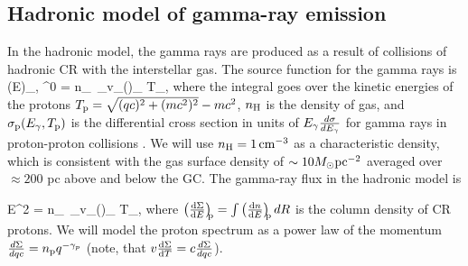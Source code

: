 

\subsection{Hadronic model of gamma-ray emission}
\label{sec:Pion_model}

In the hadronic model, the gamma rays are produced as a result of collisions of hadronic CR with the interstellar gas.
The source function for the gamma rays is 
\be
\left(E\right)_{\!\!\gamma, \pi^0}\! = \int n_\Hy\ \sigma_\pr v_\pr \left(\right)_{\!\!\pr} \de T_\pr,
\label{eq:had_spectrum}
\ee
where the integral goes over the kinetic energies of the protons $T_{\text{p}} = \sqrt{(qc)^2 + (mc^2)^2} - mc^2$,
$n_{\text{H}}$ is the density of gas, and $\sigma_{\text{p}} (E_\gamma, T_{\text{p}})$ is 
the differential cross section in units of $E_\gamma\frac{d\sigma}{d E_\gamma}$
for gamma rays in proton-proton collisions \citep{2006ApJ...647..692K, 2008ApJ...674..278K}.
We will use $n_{\text{H}} = \SI{1}{cm^{-3}}$ as a characteristic density,
which is consistent with the gas surface density of $\sim 10 M_\odot {\rm pc}^{-2}$ \citep{2017ApJ...834...57M}
averaged over $\approx 200$ pc above and below the GC.
The gamma-ray flux in the hadronic model is

\be
E^2  =  \int n_\Hy\ \sigma_\pr v_\pr \left(\right)_{\!\!\pr} \de T_\pr,
\ee
where $\left(\frac{\text{d} \Sigma}{\text{d} E}\right)_{\!\!\text{p}} = \int \left(\frac{\text{d} n}{\text{d} E}\right)_{\!\!\text{p}} dR$ is the column density 
of CR protons.
We will model the proton spectrum as a power law of the momentum $\frac{d \Sigma}{d qc} = n_{\text{p}} q^{-\gamma_p}$ 
(note, that $ v \frac{\text{d} \Sigma}{\text{d} T} = c \frac{d \Sigma}{d qc}$).

